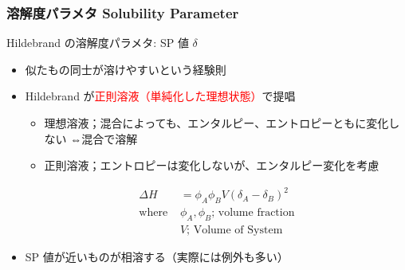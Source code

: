 \documentclass[12pt, dvipdfmx]{beamer}
\begin{document}
\begin{frame}
	\frametitle{溶解度パラメタ Solubility Parameter}
		\begin{block}{Hildebrand の溶解度パラメタ: SP 値 $\delta$}
			\begin{itemize}
				\item 似たもの同士が溶けやすいという経験則
				\item Hildebrand が\textcolor{red}{正則溶液（単純化した理想状態）}で提唱
				\begin{itemize}
					\item 理想溶液；混合によっても、エンタルピー、エントロピーともに変化しない
					⇔混合で溶解
					\item 正則溶液；エントロピーは変化しないが、エンタルピー変化を考慮
				\end{itemize}
				\vspace{-.5\baselineskip}
				\begin{align*}
					\Delta H &= \phi_A \phi_B V (\delta_A -\delta_B)^2 \\
					\text{where }& \phi_A, \phi_B \text{; volume fraction}\\
					& V \text{; Volume of System}
				\end{align*}
				\item SP 値が近いものが相溶する（実際には例外も多い）
			\end{itemize}
		\end{block}
\end{frame}
\end{document}
